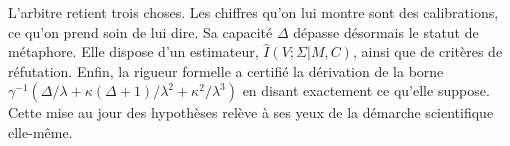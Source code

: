 \begin{boiteArbitre}
L'arbitre retient trois choses. Les chiffres qu'on lui montre sont des
calibrations, ce qu'on prend soin de lui dire. Sa capacit\'e $\Delta$ d\'epasse
d\'esormais le statut de m\'etaphore. Elle dispose d'un estimateur, $\hat I(V;\Sigma|M,C)$,
ainsi que de crit\`eres de r\'efutation. Enfin, la rigueur formelle a certifi\'e la
d\'erivation de la borne
$\gamma^{-1}(\Delta/\lambda + \kappa(\Delta+1)/\lambda^2 + \kappa^2/\lambda^3)$ en
disant exactement ce qu'elle suppose.
Cette mise au jour des hypoth\`eses rel\`eve \`a ses yeux de la d\'emarche scientifique elle-m\^eme.
\end{boiteArbitre}